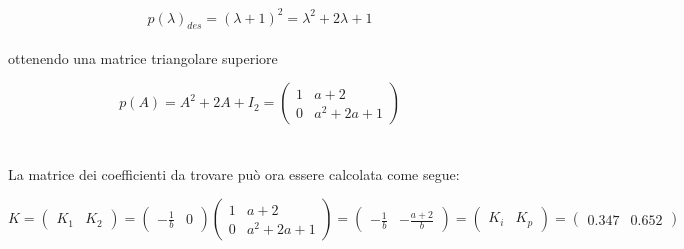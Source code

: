 \documentclass[a4paper,13pt]{article}
\begin{document}
\begin{equation*}
	p(\lambda)_{des}=(\lambda+1)^{2}=\lambda^{2}+2\lambda+1        %
\end{equation*} \\
	
	ottenendo una matrice triangolare superiore
	
\begin{equation*}
	p(A)=A^{2}+2A+I_{2}=
\begin{pmatrix}

	1&a+2\\0&a^{2}+2a+1

\end{pmatrix}
\end{equation*} \\ \\

	La matrice dei coefficienti da trovare può ora essere calcolata come segue:

\begin{equation*}
	K=
\begin{pmatrix}

	K_{1}&K_{2}

\end{pmatrix} =                  %
\begin{pmatrix}

	-\frac{1}{b}&0

\end{pmatrix}
\begin{pmatrix}

	1&a+2\\0&a^{2}+2a+1

\end{pmatrix} =                   %
\begin{pmatrix}

	-\frac{1}{b}&-\frac{a+2}{b}

\end{pmatrix} =                    %
\begin{pmatrix}

	K_{i}&K_{p}

\end{pmatrix} =                    %
\begin{pmatrix}

	0.347&0.652

\end{pmatrix}
\end{equation*}\\
\end{document}
